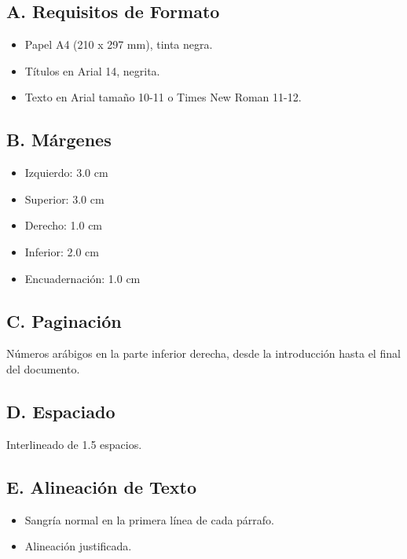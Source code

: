 \subsection*{A. Requisitos de Formato}
\begin{itemize}
    \item Papel A4 (210 x 297 mm), tinta negra.
    \item Títulos en Arial 14, negrita.
    \item Texto en Arial tamaño 10-11 o Times New Roman 11-12.
\end{itemize}

\subsection*{B. Márgenes}
\begin{itemize}
    \item Izquierdo: 3.0 cm
    \item Superior: 3.0 cm
    \item Derecho: 1.0 cm
    \item Inferior: 2.0 cm
    \item Encuadernación: 1.0 cm
\end{itemize}

\subsection*{C. Paginación}
Números arábigos en la parte inferior derecha, desde la introducción hasta el final del documento.

\subsection*{D. Espaciado}
Interlineado de 1.5 espacios.

\subsection*{E. Alineación de Texto}
\begin{itemize}
    \item Sangría normal en la primera línea de cada párrafo.
    \item Alineación justificada.
\end{itemize}
